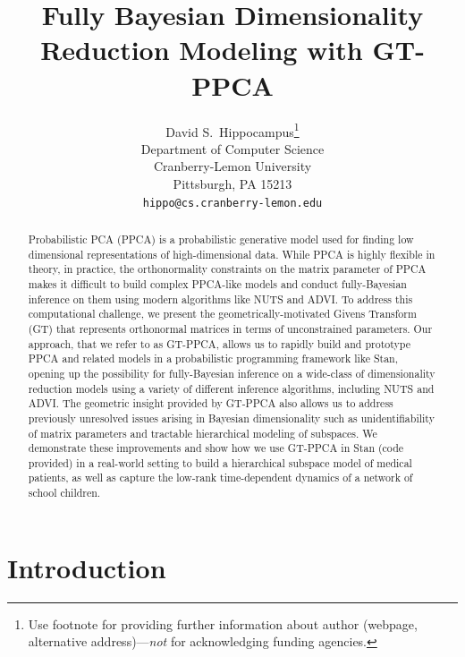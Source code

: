 \documentclass{article}
\title{Fully Bayesian Dimensionality Reduction Modeling with GT-PPCA}
\author{
  David S.~Hippocampus\thanks{Use footnote for providing further
    information about author (webpage, alternative
    address)---\emph{not} for acknowledging funding agencies.} \\
  Department of Computer Science\\
  Cranberry-Lemon University\\
  Pittsburgh, PA 15213 \\
  \texttt{hippo@cs.cranberry-lemon.edu} \\
}
\begin{document}

\maketitle

\begin{abstract}
Probabilistic PCA (PPCA) is a probabilistic generative model used for finding low dimensional representations of high-dimensional data. While PPCA is highly flexible in theory, in practice, the orthonormality constraints on the matrix parameter of PPCA makes it difficult to build complex PPCA-like models and conduct fully-Bayesian inference on them using modern algorithms like NUTS and ADVI. To address this computational challenge, we present the geometrically-motivated Givens Transform (GT) that represents orthonormal matrices in terms of unconstrained parameters. Our approach, that we refer to as GT-PPCA, allows us to rapidly build and prototype PPCA and related models in a probabilistic programming framework like Stan, opening up the possibility for fully-Bayesian inference on a wide-class of dimensionality reduction models using a variety of different inference algorithms, including NUTS and ADVI. The geometric insight provided by GT-PPCA also allows us to address previously unresolved issues arising in Bayesian dimensionality such as unidentifiability of matrix parameters and tractable hierarchical modeling of subspaces. We demonstrate these improvements and show how we use GT-PPCA in Stan (code provided) in a real-world setting to build a hierarchical subspace model of medical patients, as well as capture the low-rank time-dependent dynamics of a network of school children.
\end{abstract}

\section{Introduction}
\end{document}

